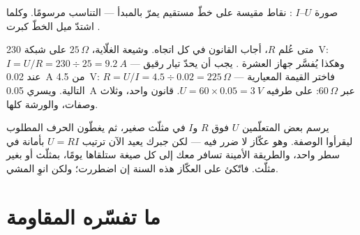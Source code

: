 \begin{omfigure}

{\small صورة $U$--$I$ : نقاط مقيسة على خطّ مستقيم يمرّ
بالمبدأ --- التناسب مرسومًا. وكلما اشتدّ ميل الخطّ كبرت
.}
\end{omfigure}

\begin{example}\label{ex:g8:ohms-law:compute}
متى عُلم $R$، أجاب القانون في كل اتجاه. وشيعة الغلّاية،
$25\,\Omega$ على شبكة \qty{230}{V}: $I = U/R = 230 \div 25 =
\qty{9.2}{A}$ --- وهكذا يُفسَّر جهاز العشرة .  يجب
أن يحدّ تيار  رقيق عند \qty{0.02}{A} من \qty{4.5}{V}:
$R = U/I = 4.5 \div 0.02 = 225\,\Omega$ --- فاختر القيمة
المعيارية التالية. ويسري \qty{0.05}{A} عبر $60\,\Omega$:
 على طرفيه $U = 60 \times 0.05 = \qty{3}{V}$. قانون
واحد، وثلاث وصفات، والورشة كلها.
\end{example}

\begin{remark}[عكّاز المثلّث]\label{rem:g8:ohms-law:triangle}
يرسم بعض المتعلّمين $U$ فوق $R$ و$I$ في مثلّث صغير، ثم يغطّون
الحرف المطلوب ليقرأوا الوصفة. وهو عكّاز لا ضرر فيه --- لكن
جبرك يعيد الآن ترتيب $U = R I$ بأمانة في سطر واحد، والطريقة
الأمينة تسافر معك إلى كل صيغة ستلقاها يومًا، بمثلّث أو بغير
مثلّث. فاتّكئ على العكّاز هذه السنة إن اضطررت؛ ولكن انوِ
المشي.
\end{remark}

\section{ما تفسّره المقاومة}

